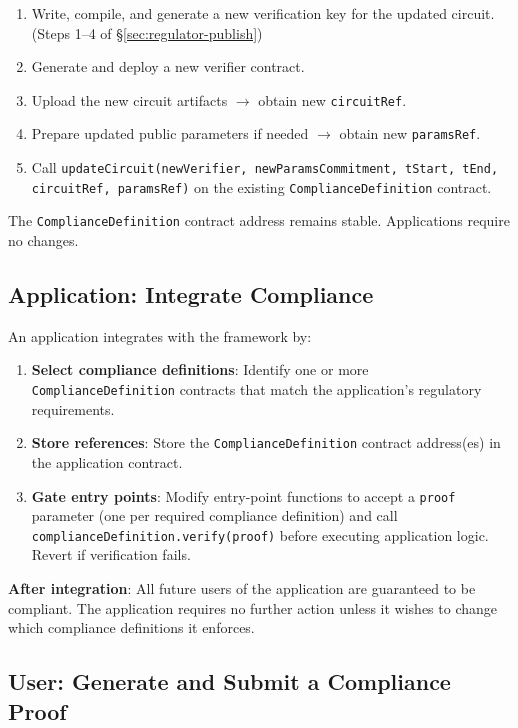 \documentclass[9pt]{extreport}
\begin{document}
\begin{enumerate}
    \item Write, compile, and generate a new verification key for the updated circuit. (Steps 1--4 of \S\ref{sec:regulator-publish})
    \item Generate and deploy a new verifier contract.
    \item Upload the new circuit artifacts $\to$ obtain new \texttt{circuitRef}.
    \item Prepare updated public parameters if needed $\to$ obtain new \texttt{paramsRef}.
    \item Call \texttt{updateCircuit(newVerifier, newParamsCommitment, tStart, tEnd, circuitRef, paramsRef)} on the existing \texttt{ComplianceDefinition} contract.
\end{enumerate}

The \texttt{ComplianceDefinition} contract address remains stable. Applications require no changes.

\subsection{Application: Integrate Compliance}
\label{sec:application-integrate}

An application integrates with the framework by:

\begin{enumerate}
    \item \textbf{Select compliance definitions}: Identify one or more \texttt{ComplianceDefinition} contracts that match the application's regulatory requirements.
    \item \textbf{Store references}: Store the \texttt{ComplianceDefinition} contract address(es) in the application contract.
    \item \textbf{Gate entry points}: Modify entry-point functions to accept a \texttt{proof} parameter (one per required compliance definition) and call \texttt{complianceDefinition.verify(proof)} before executing application logic. Revert if verification fails.
\end{enumerate}

\textbf{After integration}: All future users of the application are guaranteed to be compliant. The application requires no further action unless it wishes to change which compliance definitions it enforces.

\subsection{User: Generate and Submit a Compliance Proof}
\label{sec:user-generate-proof}
\end{document}
